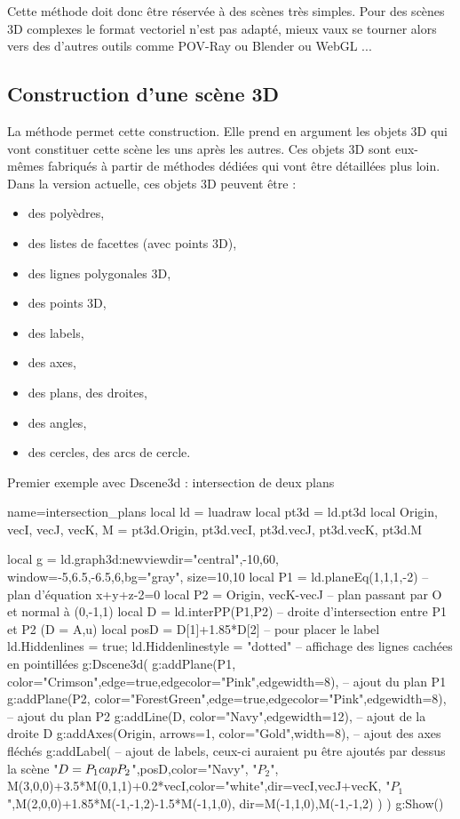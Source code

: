 Cette méthode doit donc être réservée à des scènes très simples. Pour des scènes 3D complexes le format vectoriel n'est pas adapté, mieux vaux se tourner alors vers des d'autres outils comme POV-Ray ou Blender ou WebGL ...

\subsection{Construction d'une scène 3D}

La méthode  permet cette construction. Elle prend en argument les objets 3D qui vont constituer cette scène les uns après les autres. Ces objets 3D sont eux-mêmes fabriqués à partir de méthodes dédiées qui vont être détaillées plus loin. Dans la version actuelle, ces objets 3D peuvent être :
\begin{itemize}
    \item des polyèdres, 
    \item des listes de facettes (avec points 3D),
    \item des lignes polygonales 3D,
    \item des points 3D,
    \item des labels,
    \item des axes,
    \item des plans, des droites,
    \item des angles,
    \item des cercles, des arcs de cercle.
\end{itemize}

\begin{demo}[plans]{Premier exemple avec Dscene3d : intersection de deux plans}
\begin{luadraw}{name=intersection_plans}
local ld = luadraw
local pt3d = ld.pt3d
local Origin, vecI, vecJ, vecK, M = pt3d.Origin, pt3d.vecI, pt3d.vecJ, pt3d.vecK, pt3d.M

local g = ld.graph3d:new{viewdir={"central",-10,60}, window={-5,6.5,-6.5,6},bg="gray", size={10,10}}
local P1 = ld.planeEq(1,1,1,-2) -- plan d'équation x+y+z-2=0
local P2 = {Origin, vecK-vecJ} -- plan passant par O et normal à (0,-1,1)
local D = ld.interPP(P1,P2) -- droite d'intersection entre P1 et P2 (D = {A,u})
local posD = D[1]+1.85*D[2] -- pour placer le label
ld.Hiddenlines = true; ld.Hiddenlinestyle = "dotted" -- affichage des lignes cachées en pointillées
g:Dscene3d(
    g:addPlane(P1, {color="Crimson",edge=true,edgecolor="Pink",edgewidth=8}), -- ajout du plan P1
    g:addPlane(P2, {color="ForestGreen",edge=true,edgecolor="Pink",edgewidth=8}), -- ajout du plan P2
    g:addLine(D, {color="Navy",edgewidth=12}), -- ajout de la droite D
    g:addAxes(Origin, {arrows=1, color="Gold",width=8}), -- ajout des axes fléchés
    g:addLabel( -- ajout de labels, ceux-ci auraient pu être ajoutés par dessus la scène
        "$D=P_1\\cap P_2$",posD,{color="Navy"},
        "$P_2$", M(3,0,0)+3.5*M(0,1,1)+0.2*vecI,{color="white",dir={vecI,vecJ+vecK}},
        "$P_1$",M(2,0,0)+1.85*M(-1,-1,2)-1.5*M(-1,1,0), {dir={M(-1,1,0),M(-1,-1,2)}} )
)
g:Show()
\end{luadraw}
\end{demo}


